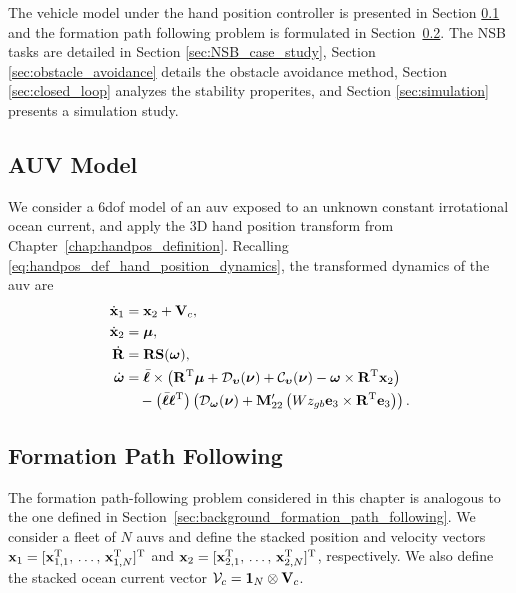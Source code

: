 The vehicle model under the hand position controller is presented in Section \ref{sec:vehicle_model} and the formation path following problem is formulated in Section~\ref{sec:formation_path_following}. The NSB tasks are detailed in Section \ref{sec:NSB_case_study}, Section \ref{sec:obstacle_avoidance} details the obstacle avoidance method, Section \ref{sec:closed_loop} analyzes the stability properites, and Section \ref{sec:simulation} presents a simulation study.

\subsection{AUV Model}\label{sec:vehicle_model}
We consider a 6\gls{dof} model of an \gls{auv} exposed to an unknown constant irrotational ocean current, and apply the 3D hand position transform from Chapter~\ref{chap:handpos_definition}.
Recalling \eqref{eq:handpos_def_hand_position_dynamics}, the transformed dynamics of the \gls{auv} are
\begin{subequations}\label{eq:linearized_system}
    \begin{align}
        \dot{\mathbf{x}}_1 &= \mathbf{x}_2 + \mathbf{V}_c,\\
        \dot{\mathbf{x}}_2 &= \bm{\mu},\\
        \dot{\mathbf{R}} &=  \mathbf{R} \mathbf{S}(\bm{\omega}),\\
        \dot{\bm{\omega}} &= \Bar{\boldsymbol{\ell}} \times \left(\mathbf{R}^{\mathrm{T}}\bm{\mu} + \mathcal{D}_{\bm{\upsilon}}(\bm{\nu}) + \mathcal{C}_{\bm{\upsilon}}(\bm{\nu}) - \bm{\omega} \times \mathbf{R}^{\mathrm{T}} \mathbf{x}_2\right) \label{eq:internal_dynamics} \\
            & \quad - \left(\Bar{\boldsymbol{\ell}}\boldsymbol{\ell}^{\mathrm{T}}\right) \left(\mathcal{D}_{\bm{\omega}}(\bm{\nu}) + \mathbf{M}_{22}^{\prime}\left(Wz_{gb} \mathbf{e}_3 \times \mathbf{R}^{\mathrm{T}} \mathbf{e}_3\right)\right). \nonumber
    \end{align}
\end{subequations}

\subsection{Formation Path Following}\label{sec:formation_path_following}
The formation path-following problem considered in this chapter is analogous to the one defined in Section~\ref{sec:background_formation_path_following}.
We consider a fleet of $N$ \glspl{auv} and define the stacked position and velocity vectors $\mathbf{x}_1 = [\mathbf{x}_{1,1}^{\mathrm{T}}, \, \ldots,\, \mathbf{x}_{1,N}^{\mathrm{T}}]^{\mathrm{T}}$ and $\mathbf{x}_2 = [\mathbf{x}_{2,1}^{\mathrm{T}}, \, \ldots,\, \mathbf{x}_{2,N}^{\mathrm{T}}]^{\mathrm{T}}$, respectively. We also define the stacked ocean current vector $\mathcal{V}_c = \mathbf{1}_{N} \otimes \mathbf{V}_c$.

